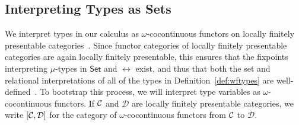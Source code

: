 \documentclass[runningheads]{llncs}
\newcommand{\set}{\mathsf{Set}}
\newcommand{\D}{\mathcal{D}}
\begin{document}
\subsection{Interpreting Types as Sets}\label{sec:set-interp}

\vspace*{-0.05in}

%
We interpret types in our calculus as $\omega$-cocontinuous functors
on locally finitely presentable categories~\cite{ar94}. Since functor
categories of locally finitely presentable categories are again
locally finitely presentable, this ensures that the fixpoints
interpreting $\mu$-types in $\set$ and $\rel$ exist, and thus that
both the set and relational interpretations of all of the types in
Definition~\ref{def:wftypes} are well-defined~\cite{jp19}. To
bootstrap this process, we will interpret type variables as
$\omega$-cocontinuous functors.
If $\cal C$ and $\D$ are locally finitely presentable categories, we
write $[\cal C,\D]$ for the category of $\omega$-cocontinuous functors
from $\cal C$ to $\D$.
\end{document}

